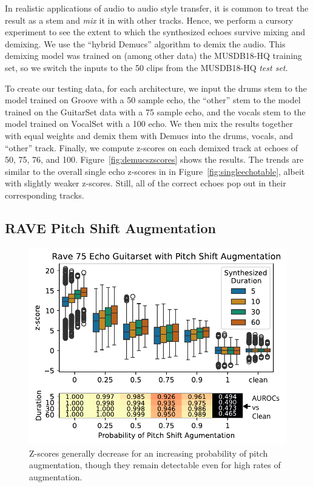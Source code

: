 \documentclass[letterpaper]{article} %
\begin{document}
In realistic applications of audio to audio style transfer, it is common to treat the result as a stem and {\em mix} it in with other tracks.  Hence, we perform a cursory experiment to see the extent to which the synthesized echoes survive mixing and demixing.  We use the ``hybrid Demucs'' algorithm \cite{defossez2019music} to demix the audio.  This demixing model was trained on (among other data) the MUSDB18-HQ training set, so we switch the inputs to the 50 clips from the MUSDB18-HQ {\em test set}.  

To create our testing data, for each architecture, we input the drums stem to the model trained on Groove with a 50 sample echo, the ``other'' stem to the model trained on the GuitarSet data with a 75 sample echo, and the vocals stem to the model trained on VocalSet with a 100 echo.  We then mix the results together with equal weights and demix them with Demucs into the drums, vocals, and ``other'' track.  Finally, we compute z-scores on each demixed track at echoes of 50, 75, 76, and 100.  Figure~\ref{fig:demucszscores} shows the results.  The trends are similar to the overall single echo z-scores in in Figure~\ref{fig:singleechotable}, albeit with slightly weaker z-scores.  Still, all of the correct echoes pop out in their corresponding tracks.


\subsection{RAVE Pitch Shift Augmentation}

\begin{figure}
    \centering
    \includegraphics[width=\columnwidth]{figs/RavePercPitchShift.pdf}
    \caption{Z-scores generally decrease for an increasing probability of pitch augmentation, though they remain detectable even for high rates of augmentation.}
    \label{fig:pitchshiftaugmentation}
\end{figure}
\end{document}
